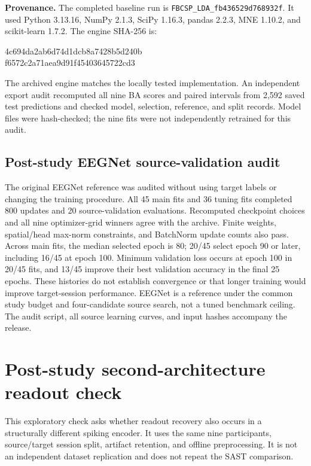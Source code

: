 \documentclass[11pt,a4paper]{article}
\begin{document}
\textbf{Provenance.} The completed baseline run is
\texttt{FBCSP\_LDA\_fb436529d768932f}. It used Python 3.13.16,
NumPy 2.1.3, SciPy 1.16.3, pandas 2.2.3, MNE 1.10.2, and scikit-learn 1.7.2.
The engine SHA-256 is:
\begin{center}\small\ttfamily
4c694da2ab6d74d1dcb8a7428b5d240b\\
f6572c2a71aea9d91f45403645722cd3
\end{center}
The archived engine matches the locally tested implementation. An independent
export audit recomputed all nine BA scores and paired intervals from 2,592
saved test predictions and checked model, selection, reference, and split
records. Model files were hash-checked; the nine fits were not independently
retrained for this audit.

\subsection{Post-study EEGNet source-validation audit}

The original EEGNet reference was audited without using target labels or changing
the training procedure. All 45 main fits and 36 tuning fits completed 800 updates
and 20 source-validation evaluations. Recomputed checkpoint choices and all nine
optimizer-grid winners agree with the archive. Finite weights, spatial/head
max-norm constraints, and BatchNorm update counts also pass. Across main fits,
the median selected epoch is 80; 20/45 select epoch 90 or later, including 16/45
at epoch 100. Minimum validation loss occurs at epoch 100 in 20/45 fits, and
13/45 improve their best validation accuracy in the final 25 epochs.
These histories do not establish convergence or that longer training would
improve target-session performance. EEGNet is a reference under the common
study budget and four-candidate source search, not a tuned benchmark ceiling.
The audit script, all source learning curves, and input hashes accompany the release.

\clearpage
\section{Post-study second-architecture readout check}

This exploratory check asks whether readout recovery also occurs in a structurally
different spiking encoder. It uses the same nine participants, source/target session
split, artifact retention, and offline preprocessing. It is not an independent
dataset replication and does not repeat the SAST comparison.
\end{document}

